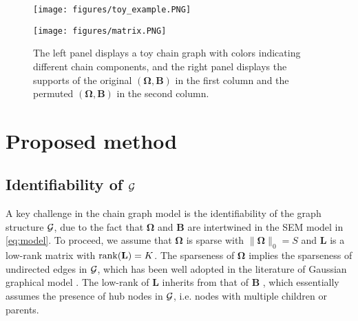 \documentclass[12pt]{article}
\def\rank{\mathop{\rm rank}}
\newcommand{\OOO}{\boldsymbol \Omega}
\newcommand{\TTT}{\boldsymbol \Theta}
\newcommand{\BB}{\mathbf B}
\newcommand{\LL}{\mathbf L}
\newcommand{\xx}{\mathbf x}
\newcommand{\1}{\uppercase\expandafter{\romannumeral1}}
\newcommand{\2}{\uppercase\expandafter{\romannumeral2}}
\newcommand{\0}{\textbf{0}}
\begin{document}

\begin{figure}[!htb]
	\centering
	\begin{minipage}[b]{0.45\textwidth}
		\centering
		\texttt{[image: figures/toy\_example.PNG]}
	\end{minipage}
	\begin{minipage}[b]{0.5\textwidth}
		\centering
		\texttt{[image: figures/matrix.PNG]}
	\end{minipage}
	\caption{The left panel displays a toy chain graph with colors indicating different chain components, and the right panel displays the supports of the original $(\OOO,\BB)$ in the first column and the permuted $(\OOO,\BB)$ in the second column.}\label{ToyExample}
\end{figure}


\section{Proposed method}\label{sec::method}


\subsection{Identifiability of $\cal G$}\label{sec::identi}

A key challenge in the chain graph model is the identifiability of the graph structure $\cal G$, due to the fact that $\OOO$ and $\BB$ are intertwined in the SEM model in \eqref{eq:model}. To proceed, we assume that $\OOO$ is sparse with $\|\OOO\|_0 = S$ and $\LL$ is a low-rank matrix with $\rank(\LL) = K$. The sparseness of $\OOO$ implies the sparseness of undirected edges in ${\cal G}$, which has been well adopted in the literature of Gaussian  graphical model \cite{Meinshausen2006, Friedman2008, Cai2011}. The low-rank of $\LL$ inherits from that of $\BB$ \cite{Fang2020}, which essentially assumes the presence of hub nodes in $\cal G$, i.e. nodes with multiple children or parents.
\end{document}

